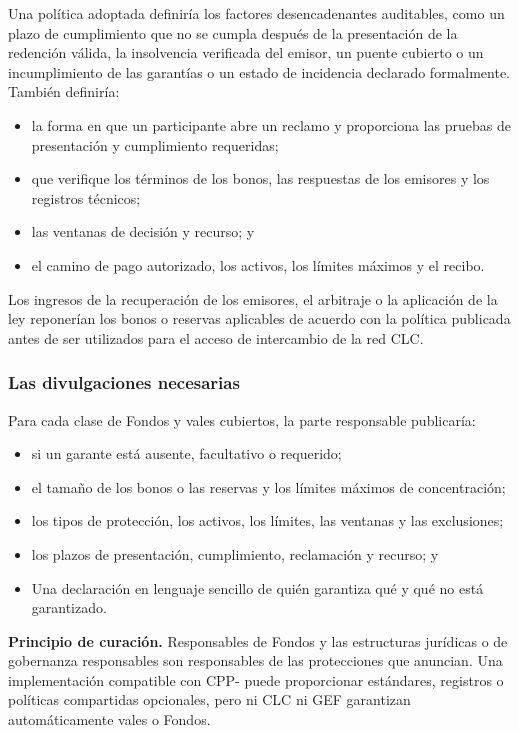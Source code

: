 \documentclass[11pt]{article}
\begin{document}
Una política adoptada definiría los factores desencadenantes auditables, como un plazo de cumplimiento que no se cumpla después de la presentación de la redención válida, la insolvencia verificada del emisor, un puente cubierto o un incumplimiento de las garantías o un estado de incidencia declarado formalmente. También definiría:

\begin{itemize}[leftmargin=*]
\item la forma en que un participante abre un reclamo y proporciona las pruebas de presentación y cumplimiento requeridas;
\item que verifique los términos de los bonos, las respuestas de los emisores y los registros técnicos;
\item las ventanas de decisión y recurso; y
\item el camino de pago autorizado, los activos, los límites máximos y el recibo.
\end{itemize}
Los ingresos de la recuperación de los emisores, el arbitraje o la aplicación de la ley reponerían los bonos o reservas aplicables de acuerdo con la política publicada antes de ser utilizados para el acceso de intercambio de la red CLC.

\subsubsection*{Las divulgaciones necesarias}

Para cada clase de Fondos y vales cubiertos, la parte responsable publicaría:

\begin{itemize}[leftmargin=*]
\item si un garante está ausente, facultativo o requerido;
\item el tamaño de los bonos o las reservas y los límites máximos de concentración;
\item los tipos de protección, los activos, los límites, las ventanas y las exclusiones;
\item los plazos de presentación, cumplimiento, reclamación y recurso; y
\item Una declaración en lenguaje sencillo de quién garantiza qué y qué no está garantizado.
\end{itemize}
\textbf{Principio de curación.} Responsables de Fondos y las estructuras jurídicas o de gobernanza responsables son responsables de las protecciones que anuncian. Una implementación compatible con CPP- puede proporcionar estándares, registros o políticas compartidas opcionales, pero ni CLC ni GEF garantizan automáticamente vales o Fondos.
\end{document}
